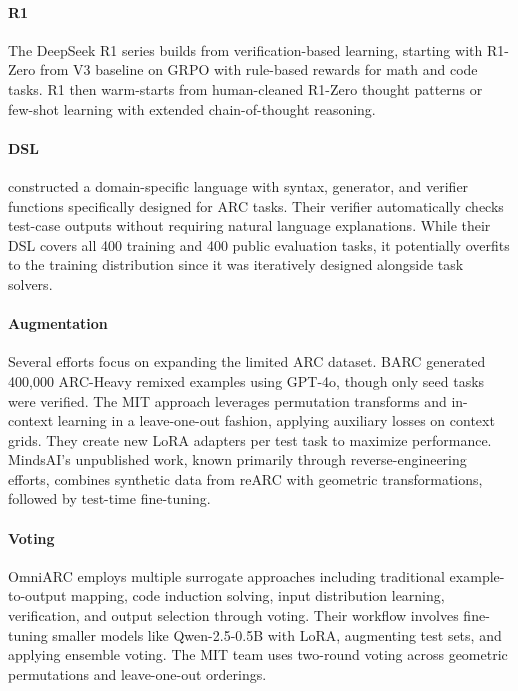 \documentclass{article}
\begin{document}
\paragraph{R1} The DeepSeek R1 series \cite{r1} builds from verification-based learning, starting with R1-Zero from V3 baseline on GRPO with rule-based rewards for math and code tasks. R1 then warm-starts from human-cleaned R1-Zero thought patterns or few-shot learning with extended chain-of-thought reasoning.

\paragraph{DSL} \cite{Hodel} constructed a domain-specific language with syntax, generator, and verifier functions specifically designed for ARC tasks. Their verifier automatically checks test-case outputs without requiring natural language explanations. While their DSL covers all 400 training and 400 public evaluation tasks, it potentially overfits to the training distribution since it was iteratively designed alongside task solvers.

\paragraph{Augmentation} Several efforts focus on expanding the limited ARC dataset. BARC \cite{barc} generated 400,000 ARC-Heavy remixed examples using GPT-4o, though only seed tasks were verified. The MIT approach \cite{MIT} leverages permutation transforms and in-context learning in a leave-one-out fashion, applying auxiliary losses on context grids. They create new LoRA adapters per test task to maximize performance. MindsAI's unpublished work, known primarily through reverse-engineering efforts, combines synthetic data from reARC with geometric transformations, followed by test-time fine-tuning.

\paragraph{Voting} OmniARC \cite{OmniARC} employs multiple surrogate approaches including traditional example-to-output mapping, code induction solving, input distribution learning, verification, and output selection through voting. Their workflow involves fine-tuning smaller models like Qwen-2.5-0.5B with LoRA, augmenting test sets, and applying ensemble voting. The MIT team uses two-round voting across geometric permutations and leave-one-out orderings.
\end{document}
